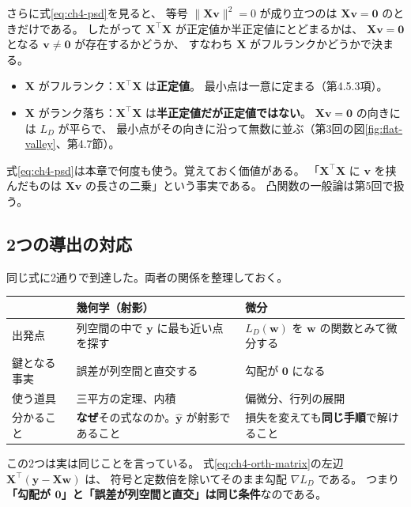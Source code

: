 さらに式\eqref{eq:ch4-psd}を見ると、
等号 $\|\bm{X}\bm{v}\|^2 = 0$ が成り立つのは $\bm{X}\bm{v} = \bm{0}$ のときだけである。
したがって $\bm{X}^\top\bm{X}$ が正定値か半正定値にとどまるかは、
$\bm{X}\bm{v} = \bm{0}$ となる $\bm{v} \neq \bm{0}$ が存在するかどうか、
すなわち $\bm{X}$ がフルランクかどうかで決まる。
\begin{itemize}
  \item $\bm{X}$ がフルランク：$\bm{X}^\top\bm{X}$ は\textbf{正定値}。
    最小点は一意に定まる（第4.5.3項）。
  \item $\bm{X}$ がランク落ち：$\bm{X}^\top\bm{X}$ は\textbf{半正定値だが正定値ではない}。
    $\bm{X}\bm{v} = \bm{0}$ の向きには $L_D$ が平らで、
    最小点がその向きに沿って無数に並ぶ（第3回の図\ref{fig:flat-valley}、第4.7節）。
\end{itemize}

式\eqref{eq:ch4-psd}は本章で何度も使う。覚えておく価値がある。
「$\bm{X}^\top\bm{X}$ に $\bm{v}$ を挟んだものは $\bm{X}\bm{v}$ の長さの二乗」という事実である。
凸関数の一般論は第5回で扱う。


\subsection{2つの導出の対応}

同じ式に2通りで到達した。両者の関係を整理しておく。

\begin{center}
\begin{tabular}{l|p{4.6cm}|p{4.6cm}}
\hline
 & 幾何学（射影） & 微分 \\
\hline\hline
出発点 & 列空間の中で $\bm{y}$ に最も近い点を探す & $L_D(\bm{w})$ を $\bm{w}$ の関数とみて微分する \\
\hline
鍵となる事実 & 誤差が列空間と直交する & 勾配が $\bm{0}$ になる \\
\hline
使う道具 & 三平方の定理、内積 & 偏微分、行列の展開 \\
\hline
分かること & \textbf{なぜ}その式なのか。$\hat{\bm{y}}$ が射影であること & 損失を変えても\textbf{同じ手順}で解けること \\
\hline
\end{tabular}
\end{center}

この2つは実は同じことを言っている。
式\eqref{eq:ch4-orth-matrix}の左辺 $\bm{X}^\top(\bm{y} - \bm{X}\bm{w})$ は、
符号と定数倍を除いてそのまま勾配 $\nabla L_D$ である。
つまり\textbf{「勾配が $\bm{0}$」と「誤差が列空間と直交」は同じ条件}なのである。

